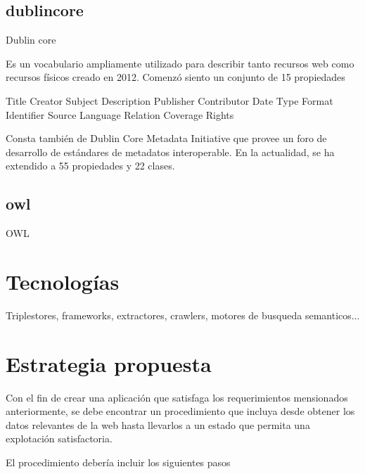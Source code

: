 \subsection{dublincore}

Dublin core

Es un vocabulario ampliamente utilizado para describir tanto recursos web como recursos físicos creado en 2012. Comenzó siento un conjunto de 15 
propiedades 

    Title
    Creator
    Subject
    Description
    Publisher
    Contributor
    Date
    Type
    Format
    Identifier
    Source
    Language
    Relation
    Coverage
    Rights

Consta también de Dublin Core Metadata Initiative que provee un foro de desarrollo de estándares de metadatos interoperable.
En la actualidad, se ha extendido a 55 propiedades y 22 clases.

\subsection{owl}

OWL



\section{Tecnologías}
Triplestores, frameworks, extractores, crawlers, motores de busqueda semanticos...

\section{Estrategia propuesta}
Con el fin de crear una aplicación que satisfaga los requerimientos mensionados anteriormente, se debe encontrar
un procedimiento que incluya desde obtener los datos relevantes de la web hasta llevarlos a un estado que permita una 
explotación satisfactoria. 

El procedimiento debería incluir los siguientes pasos  

